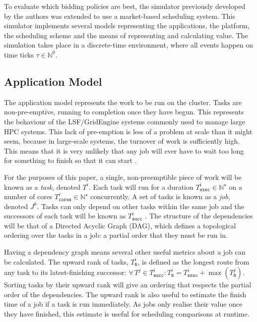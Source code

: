 \documentclass[english,british]{IEEEtran}
\begin{document}
To evaluate which bidding policies are best, the simulator previously
developed by the authors \cite{aburkimsherEngD14} was extended to
use a market-based scheduling system. This simulator implements several
models representing the applications, the platform, the scheduling
scheme and the means of representing and calculating value. The simulation
takes place in a discrete-time environment, where all events happen
on time ticks $\tau\in\mathbb{N^{\mathrm{0}}}$. 


\subsection{Application Model}

The application model represents the work to be run on the cluster.
Tasks are non-pre-emptive, running to completion once they have begun.
This represents the behaviour of the LSF/GridEngine systems commonly
used to manage large HPC systems. This lack of pre-emption is less
of a problem at scale than it might seem, because in large-scale systems,
the turnover of work is sufficiently high. This means that it is very
unlikely that any job will ever have to wait too long for something
to finish so that it can start \cite{burkimsher14}. 

For the purposes of this paper, a single, non-preemptible piece of
work will be known as a \emph{task}, denoted $T^{i}$. Each task will
run for a duration $T_{\mathtt{exec}}^{i}\in\mathbb{N^{\star}}$ on
a number of cores $T_{\mathtt{cores}}^{i}\in\mathbb{N^{\star}}$ concurrently.
A set of tasks is known as a \emph{job}, denoted $J^{k}$. Tasks can
only depend on other tasks within the same job and the successors
of each task will be known as $T_{\mathtt{succ}}^{i}$ . The structure
of the dependencies will be that of a Directed Acyclic Graph (DAG),
which defines a topological ordering over the tasks in a job: a partial
order that they must be run in.

Having a dependency graph means several other useful metrics about
a job can be calculated. The upward rank \cite{Topcuoglu2002} of
tasks, $T_{\mathtt{R}}^{i}$, is defined as the longest route from
any task to its latest-finishing successor: $\forall\,T^{j}\in T_{\mathtt{succ}}^{i}:T_{\mathtt{R}}^{i}=T_{\mathtt{exec}}^{i}+\max(T_{\mathtt{R}}^{j})$.
Sorting tasks by their upward rank will give an ordering that respects
the partial order of the dependencies. The upward rank is also useful
to estimate the finish time of a job if a task is run immediately.
As jobs only realise their value once they have finished, this estimate
is useful for scheduling comparisons at runtime.
\end{document}
